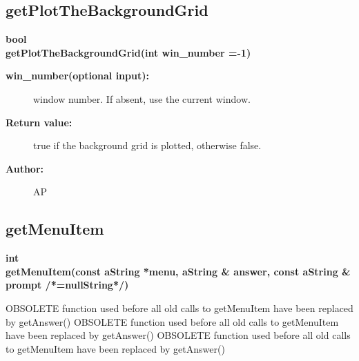 \subsection{getPlotTheBackgroundGrid}
 
\begin{flushleft} \textbf{%
bool  \\ 
\settowidth{\GLGraphicsInterfaceIncludeArgIndent}{getPlotTheBackgroundGrid(}%
getPlotTheBackgroundGrid(int win\_number  =-1)
}\end{flushleft}
\begin{description}
\item[{\bf win\_number(optional input):}]  window number. If absent, use the current window.

\item[{\bf Return value:}]  true if the background grid is plotted, otherwise false.
\item[{\bf Author:}]  AP
\end{description}
\subsection{getMenuItem}
 
\begin{flushleft} \textbf{%
int  \\ 
\settowidth{\GLGraphicsInterfaceIncludeArgIndent}{getMenuItem(}%
getMenuItem(const aString *menu, aString \& answer, const aString \& prompt /*=nullString*/)
}\end{flushleft}


 OBSOLETE function used before all old calls to getMenuItem have been replaced by getAnswer()
 OBSOLETE function used before all old calls to getMenuItem have been replaced by getAnswer()
 OBSOLETE function used before all old calls to getMenuItem have been replaced by getAnswer()


